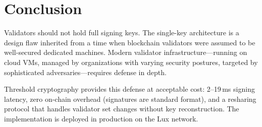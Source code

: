 \documentclass[11pt,a4paper]{article}
\begin{document}
\section{Conclusion}

Validators should not hold full signing keys. The single-key architecture is a
design flaw inherited from a time when blockchain validators were assumed to be
well-secured dedicated machines. Modern validator infrastructure---running on
cloud VMs, managed by organizations with varying security postures, targeted by
sophisticated adversaries---requires defense in depth.

Threshold cryptography provides this defense at acceptable cost: 2--19\,ms signing
latency, zero on-chain overhead (signatures are standard format), and a resharing
protocol that handles validator set changes without key reconstruction. The
implementation is deployed in production on the Lux network.
\end{document}
